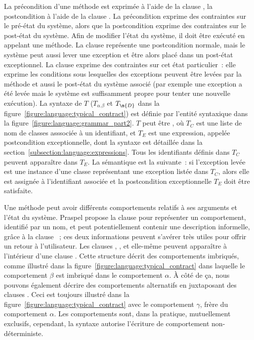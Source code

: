 La précondition d'une méthode est exprimée à l'aide de la clause \arequires, la
postcondition à l'aide de la clause \aensures. La précondition exprime des
contraintes sur le {\strong pré-état} du système, alors que la postcondition
exprime des contraintes sur le {\strong post-état} du système. Afin de modifier
l'état du système, il doit être exécuté en appelant une méthode. La clause
\aensures représente une {\strong postcondition normale}, mais le système peut
aussi lever une exception et être alors placé dans un {\strong post-état
exceptionnel}. La clause \athrowable exprime des contraintes sur cet état
particulier~: elle exprime les conditions sous lesquelles des exceptions peuvent
être levées par la méthode et aussi le post-état du système associé (par exemple
une exception a été levée mais le système est suffisamment propre pour tenter
une nouvelle exécution). La syntaxe de $T$ ($T_{\alpha.\beta}$ et $T_\m{D}$ dans
la figure~\ref{figure:language:typical_contract}) est définie par l'entité
syntaxique  dans la
figure~\ref{figure:language:grammar_part2}. $T$ peut être , où $T_C$ est une liste de nom de classes asssociée à un identifiant, et
$T_E$ est une expression, appelée {\strong postcondition exceptionnelle}, dont
la syntaxe est détaillée dans la section~\ref{subsection:language:expressions}.
Tous les identifiants définis dans $T_C$ peuvent apparaître dans $T_E$. La
sémantique est la suivante~: si l'exception levée est une instance d'une classe
représentant une exception listée dans $T_C$, alors elle est assignée à
l'identifiant associée et la postcondition exceptionnelle $T_E$ doit être
satisfaite.

Une méthode peut avoir différents {\strong comportements} relatifs à ses
arguments et l'état du système. Praspel propose la clause \abehavior pour
représenter un comportement, identifié par un nom, et peut potentiellement
contenir une description informelle, grâce à la clause \adescription~; ces deux
informations peuvent s'avérer très utiles pour offrir un retour à l'utilisateur.
Les clauses \arequires, \aensures, \athrowable et \abehavior elle-même peuvent
apparaître à l'intérieur d'une clause \abehavior. Cette structure décrit des
comportements {\strong imbriqués}, comme illustré dans la
figure~\ref{figure:language:typical_contract} dans laquelle le comportement
$\beta$ est imbriqué dans le comportement $\alpha$. À côté de ça, nous pouvons
également décrire des comportements {\strong alternatifs} en juxtaposant des
clauses \abehavior. Ceci est toujours illustré dans la
figure~\ref{figure:language:typical_contract} avec le comportement $\gamma$,
frère du comportement $\alpha$. Les comportements sont, dans la pratique,
{\strong mutuellement exclusifs}, cependant, la syntaxe autorise l'écriture de
comportement non-déterministe.


